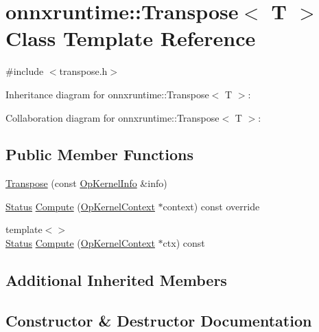 \hypertarget{classonnxruntime_1_1Transpose}{}\section{onnxruntime\+:\+:Transpose$<$ T $>$ Class Template Reference}
\label{classonnxruntime_1_1Transpose}


{\ttfamily \#include $<$transpose.\+h$>$}



Inheritance diagram for onnxruntime\+:\+:Transpose$<$ T $>$\+:


Collaboration diagram for onnxruntime\+:\+:Transpose$<$ T $>$\+:
\subsection*{Public Member Functions}
\begin{DoxyCompactItemize}
\item 
\mbox{\hyperlink{classonnxruntime_1_1Transpose_a420feeff0afe836444e18d6791dcaa13}{Transpose}} (const \mbox{\hyperlink{classonnxruntime_1_1OpKernelInfo}{Op\+Kernel\+Info}} \&info)
\item 
\mbox{\hyperlink{classonnxruntime_1_1common_1_1Status}{Status}} \mbox{\hyperlink{classonnxruntime_1_1Transpose_ae4992515bde56895bc8c4641ec3d489b}{Compute}} (\mbox{\hyperlink{classonnxruntime_1_1OpKernelContext}{Op\+Kernel\+Context}} $\ast$context) const override
\item 
{\footnotesize template$<$$>$ }\\\mbox{\hyperlink{classonnxruntime_1_1common_1_1Status}{Status}} \mbox{\hyperlink{classonnxruntime_1_1Transpose_abb0c686c43c09404457c66b123ceb951}{Compute}} (\mbox{\hyperlink{classonnxruntime_1_1OpKernelContext}{Op\+Kernel\+Context}} $\ast$ctx) const
\end{DoxyCompactItemize}
\subsection*{Additional Inherited Members}


\subsection{Constructor \& Destructor Documentation}
\mbox{\label{classonnxruntime_1_1Transpose_a420feeff0afe836444e18d6791dcaa13}} 
